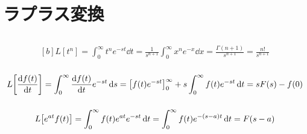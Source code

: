 \documentclass[../ap_2017.tex]{subfiles}
\begin{document}
\setcounter{chapter}{4}
\chapter{ラプラス変換}
\section{}
\subsection{}
\begin{equation}\begin{aligned}[b]
    L[t^n] = \int_{0}^{\infty} t^n e^{-st} \dd{t}
    = \frac{1}{s^{n+1}}\int_{0}^{\infty}x^n e^{-x}\dd{x}
    = \frac{\Gamma(n+1)}{s^{n+1}}
    = \frac{n!}{s^{n+1}}
\end{aligned}\end{equation}
\subsection{}
\begin{equation}\begin{aligned}[b]
    L\qty[\dv{f(t)}{t}] = \int_{0}^{\infty}\dv{f(t)}{t}e^{-st}\dd{s}
    = \qty[f(t)e^{-st}]_0^\infty +s\int_{0}^{\infty}f(t)e^{-st}\dd{t}
    = sF(s)-f(0)
\end{aligned}\end{equation}

\subsection{}
\begin{equation}\begin{aligned}[b]
    L\qty[e^{at}f(t)] = \int_{0}^{\infty}f(t)e^{at}e^{-st}\dd{t}
    = \int_{0}^{\infty}f(t)e^{-(s-a)t}\dd{t}
    =F(s-a)
\end{aligned}\end{equation}
\end{document}
